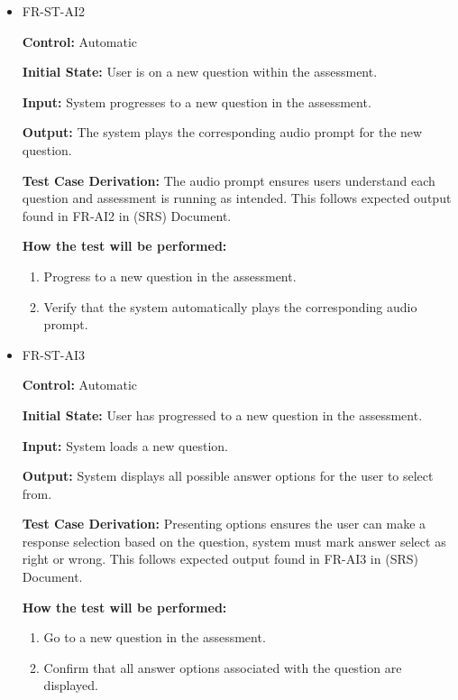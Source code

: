 \documentclass[12pt, titlepage]{article}
\begin{document}
\begin{itemize}
  \item FR-ST-AI2
    \begin{mdframed}[linewidth=0.5mm]
      \textbf{Control:} Automatic \par
      \textbf{Initial State:} User is on a new question within the assessment. \par
      \textbf{Input:} System progresses to a new question in the assessment. \par
      \textbf{Output:} The system plays the corresponding audio prompt for the new question. \par
      \textbf{Test Case Derivation:} The audio prompt ensures users understand each question and assessment is running as intended.
      This follows expected output found in FR-AI2 in (SRS) Document. \par
      \textbf{How the test will be performed:}
      \begin{enumerate}[noitemsep]
        \item Progress to a new question in the assessment.
        \item Verify that the system automatically plays the corresponding audio prompt.
      \end{enumerate}
    \end{mdframed}

  \item FR-ST-AI3
    \begin{mdframed}[linewidth=0.5mm]
      \textbf{Control:} Automatic \par
      \textbf{Initial State:} User has progressed to a new question in the assessment. \par
      \textbf{Input:} System loads a new question. \par
      \textbf{Output:} System displays all possible answer options for the user to select from. \par
      \textbf{Test Case Derivation:} Presenting options ensures the user can make a response selection based
       on the question, system must mark answer select as right or wrong. 
       This follows expected output found in FR-AI3 in (SRS) Document. \par
      \textbf{How the test will be performed:}
      \begin{enumerate}[noitemsep]
        \item Go to a new question in the assessment.
        \item Confirm that all answer options associated with the question are displayed.
      \end{enumerate}
    \end{mdframed}


\end{itemize}
\end{document}
